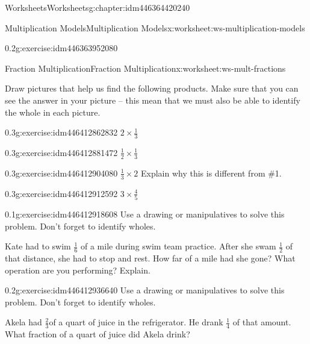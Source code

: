 \documentclass[twoside,11pt,]{book}
\begin{document}
\begin{chapterptx}{Worksheets}{}{Worksheets}{}{}{g:chapter:idm446364420240}
\begin{worksheet-section-numberless}{Multiplication Models}{}{Multiplication Models}{}{}{x:worksheet:ws-multiplication-models}
\begin{divisionexercise}{18}{}{0.2}{g:exercise:idm446363952080}
\end{divisionexercise}%
\end{worksheet-section-numberless}
\restoregeometry
%
%
\typeout{************************************************}
\typeout{************************************************}
%
\begin{worksheet-section-numberless}{Fraction Multiplication}{}{Fraction Multiplication}{}{}{x:worksheet:ws-mult-fractions}
\begin{introduction}{}%
Draw pictures that help us find the following products.  Make sure that you can see the answer in your picture – this mean that we must also be able to identify the whole in each picture.%
\end{introduction}%
\begin{divisionexercise}{1}{}{0.3}{g:exercise:idm446412862832}%
\(2 \times \frac{1}{3} \)%
\end{divisionexercise}%
\begin{divisionexercise}{2}{}{0.3}{g:exercise:idm446412881472}%
\(\frac{1}{2} \times \frac{1}{3} \)%
\end{divisionexercise}%
\clearpage
\begin{divisionexercise}{3}{}{0.3}{g:exercise:idm446412904080}%
\(\frac{1}{3} \times 2  \)  Explain why this is different from \#1.%
\end{divisionexercise}%
\begin{divisionexercise}{4}{}{0.3}{g:exercise:idm446412912592}%
\(3 \times \frac{4}{5} \)%
\end{divisionexercise}%
\begin{divisionexercise}{5}{}{0.1}{g:exercise:idm446412918608}%
Use a drawing or manipulatives to solve this problem. Don’t forget to identify wholes.%
\par
Kate had to swim \(\frac{1}{6} \) of a mile during swim team practice.  After she swam \(\frac{1}{2} \) of that distance, she had to stop and rest. How far of a mile had she gone? What operation are you performing? Explain.%
\end{divisionexercise}%
\clearpage
\begin{divisionexercise}{6}{}{0.2}{g:exercise:idm446412936640}%
Use a drawing or manipulatives to solve this problem. Don’t forget to identify wholes.%
\par
Akela had \(\frac{2}{3} \)of a quart of juice in the refrigerator.  He drank \(\frac{1}{4} \) of that amount. What fraction of a quart of juice did Akela drink?%

\end{divisionexercise}
\end{worksheet-section-numberless}
\end{chapterptx}
\end{document}
